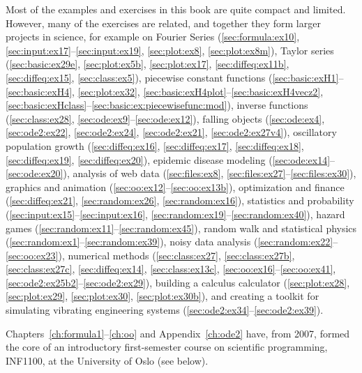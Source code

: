 Most of the examples and exercises in this book are quite compact
and limited. However, many of the exercises are related,
and together they form larger projects in science, for example on
Fourier Series (\ref{sec:formula:ex10},
\ref{sec:input:ex17}--\ref{sec:input:ex19}, \ref{sec:plot:ex8},
\ref{sec:plot:ex8m}),
Taylor series (\ref{sec:basic:ex29e}, \ref{sec:plot:ex5b}, \ref{sec:plot:ex17}, \ref{sec:diffeq:ex11b}, \ref{sec:diffeq:ex15}, \ref{sec:class:ex5}),
piecewise constant functions (\ref{sec:basic:exH1}--\ref{sec:basic:exH4},
\ref{sec:plot:ex32}, \ref{sec:basic:exH4plot}--\ref{sec:basic:exH4vecz2},
\ref{sec:basic:exHclass}--\ref{sec:basic:ex:piecewisefunc:mod}),
inverse functions (\ref{sec:class:ex28}, \ref{sec:ode:ex9}--\ref{sec:ode:ex12}),
falling objects
(\ref{sec:ode:ex4}, \ref{sec:ode2:ex22}, \ref{sec:ode2:ex24}, \ref{sec:ode2:ex21}, \ref{sec:ode2:ex27v4}),
oscillatory population growth
(\ref{sec:diffeq:ex16}, \ref{sec:diffeq:ex17}, \ref{sec:diffeq:ex18}, \ref{sec:diffeq:ex19}, \ref{sec:diffeq:ex20}),
epidemic disease modeling (\ref{sec:ode:ex14}--\ref{sec:ode:ex20}),
analysis of web data
(\ref{sec:files:ex8}, \ref{sec:files:ex27}--\ref{sec:files:ex30}),
graphics and animation
(\ref{sec:oo:ex12}--\ref{sec:oo:ex13b}),
optimization and finance
(\ref{sec:diffeq:ex21}, \ref{sec:random:ex26}, \ref{sec:random:ex16}),
statistics and probability
(\ref{sec:input:ex15}--\ref{sec:input:ex16}, \ref{sec:random:ex19}--\ref{sec:random:ex40}),
hazard games
(\ref{sec:random:ex11}--\ref{sec:random:ex45}),
random walk and statistical physics
(\ref{sec:random:ex1}--\ref{sec:random:ex39}),
noisy data analysis
(\ref{sec:random:ex22}--\ref{sec:oo:ex23}),
numerical methods
(\ref{sec:class:ex27}, \ref{sec:class:ex27b}, \ref{sec:class:ex27c}, \ref{sec:diffeq:ex14}, \ref{sec:class:ex13c}, \ref{sec:oo:ex16}--\ref{sec:oo:ex41}, \ref{sec:ode2:ex25b2}--\ref{sec:ode2:ex29}),
building a calculus calculator
(\ref{sec:plot:ex28}, \ref{sec:plot:ex29}, \ref{sec:plot:ex30}, \ref{sec:plot:ex30b}),
and creating a toolkit for
simulating vibrating engineering
systems (\ref{sec:ode2:ex34}--\ref{sec:ode2:ex39}).

Chapters~\ref{ch:formula1}--\ref{ch:oo} and Appendix~\ref{ch:ode2}
have, from 2007,
formed the core of an introductory first-semester course on scientific
programming, INF1100, at the University of Oslo (see below).



